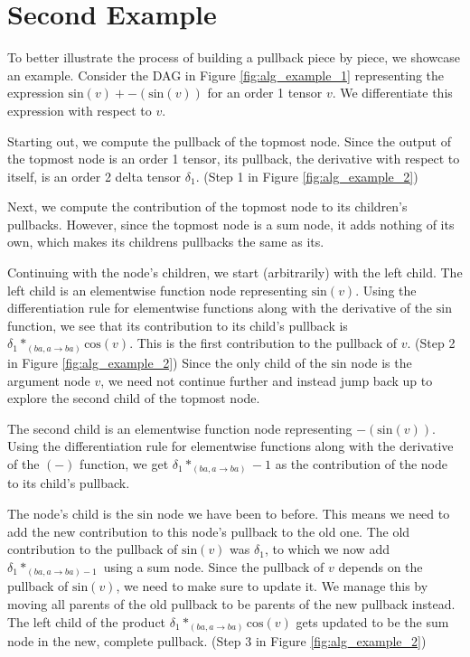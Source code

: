 \documentclass[12pt, a4paper]{report}
\begin{document}
\section{Second Example}
To better illustrate the process of building a pullback piece by piece, we showcase an example.
Consider the DAG in Figure \ref{fig:alg_example_1} representing the expression $\text{sin}(v) + -(\text{sin}(v))$ for an order 1 tensor $v$.
We differentiate this expression with respect to $v$.

Starting out, we compute the pullback of the topmost node.
Since the output of the topmost node is an order 1 tensor, its pullback, the derivative with respect to itself, is an order 2 delta tensor $\delta_1$. (Step 1 in Figure \ref{fig:alg_example_2})

Next, we compute the contribution of the topmost node to its children's pullbacks.
However, since the topmost node is a sum node, it adds nothing of its own, which makes its childrens pullbacks the same as its.

Continuing with the node's children, we start (arbitrarily) with the left child.
The left child is an elementwise function node representing $\text{sin}(v)$.
Using the differentiation rule for elementwise functions along with the derivative of the $\text{sin}$ function, we see that its contribution to its child's pullback is $\delta_1 *_{(ba,a \rightarrow ba)} \text{cos}(v)$.
This is the first contribution to the pullback of $v$. (Step 2 in Figure \ref{fig:alg_example_2})
Since the only child of the $\text{sin}$ node is the argument node $v$, we need not continue further and instead jump back up to explore the second child of the topmost node.

The second child is an elementwise function node representing $-(\text{sin}(v))$.
Using the differentiation rule for elementwise functions along with the derivative of the $(-)$ function, we get $\delta_1 *_{(ba,a \rightarrow ba)} -1$ as the contribution of the node to its child's pullback.

The node's child is the $\text{sin}$ node we have been to before.
This means we need to add the new contribution to this node's pullback to the old one.
The old contribution to the pullback of $\text{sin}(v)$ was $\delta_1$, to which we now add $\delta_1 *_{(ba,a \rightarrow ba) -1}$ using a sum node.
Since the pullback of $v$ depends on the pullback of $\text{sin}(v)$, we need to make sure to update it.
We manage this by moving all parents of the old pullback to be parents of the new pullback instead.
The left child of the product $\delta_1 *_{(ba,a \rightarrow ba)} \text{cos}(v)$ gets updated to be the sum node in the new, complete pullback. (Step 3 in Figure \ref{fig:alg_example_2})
\end{document}

